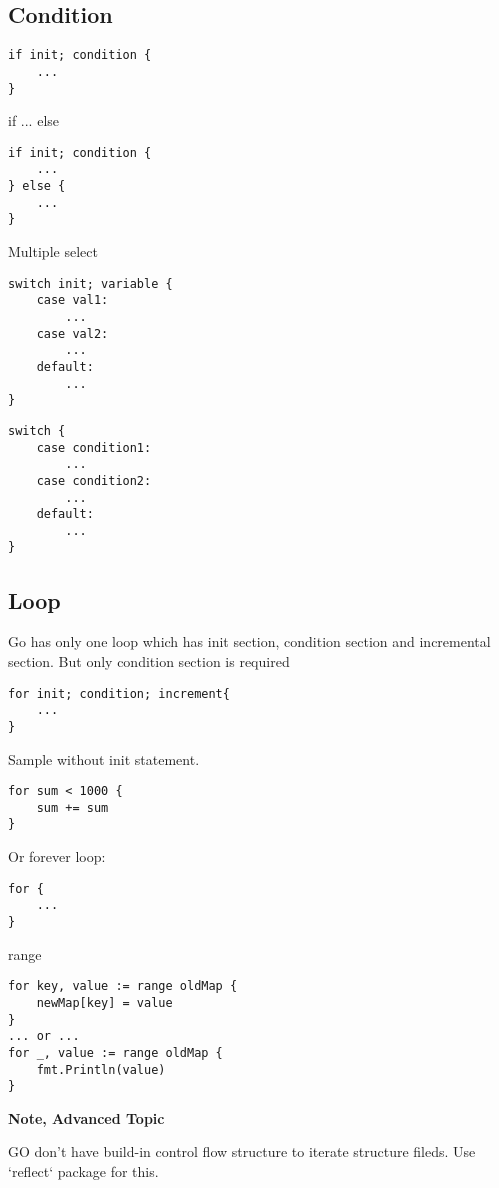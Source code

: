 \documentclass[12pt]{article}
\begin{document}
\subsection{Condition}
\begin{lstlisting}
if init; condition {
    ...
}
\end{lstlisting}

if ... else

\begin{lstlisting}
if init; condition {
    ...
} else {
    ...
}
\end{lstlisting}

Multiple select
\begin{lstlisting}
switch init; variable {
    case val1:
        ...
    case val2:
        ...
    default:
        ...
}
\end{lstlisting}

\begin{lstlisting}
switch {
    case condition1:
        ...
    case condition2:
        ...
    default:
        ...
}
\end{lstlisting}



\subsection{Loop}
Go has only one loop which has init section, condition section
and incremental section. But only condition section is required
\begin{lstlisting}
for init; condition; increment{
    ...
}
\end{lstlisting}

Sample without init statement.
\begin{lstlisting}
for sum < 1000 {
    sum += sum
}
\end{lstlisting}

Or forever loop:
\begin{lstlisting}
for {
    ...
}
\end{lstlisting}

range
\begin{lstlisting}
for key, value := range oldMap {
    newMap[key] = value
}
... or ...
for _, value := range oldMap {
    fmt.Println(value)
}
\end{lstlisting}

\textbf{Note, Advanced Topic}

GO don't have build-in control flow structure to iterate structure fileds. Use
`reflect` package for this.
\end{document}
